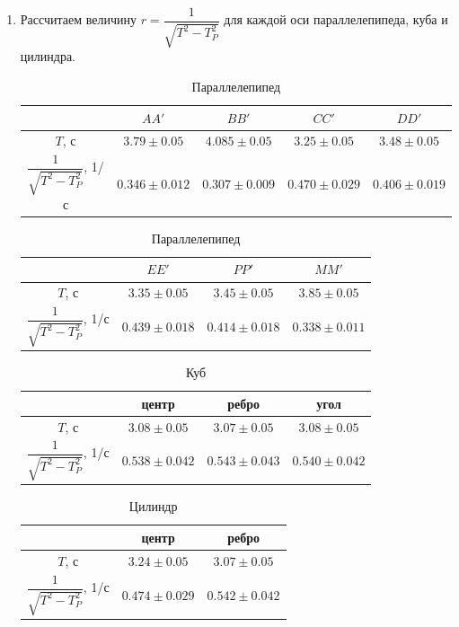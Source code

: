 \documentclass[a4paper,12pt]{article}
\begin{document}
\begin{enumerate}
    \item Рассчитаем величину $r = \dfrac{1}{\sqrt{T^2 - T^2_P}}$ для каждой оси параллелепипеда, куба и цилиндра.
        \begin{table}[!h]
            \centering
            \begin{tabular}{|c|c|c|c|c|} \hline
                 & $AA'$ & $BB'$ & $CC'$ & $DD'$ \\ \hline
                $T$, с & $3.79\pm0.05$ & $4.085\pm0.05$ & $3.25\pm0.05$ & $3.48\pm0.05$ \\ \hline
                $\dfrac{1}{\sqrt{T^2 - T^2_P}}$, 1/с & $0.346\pm0.012$ & $0.307\pm0.009$ & $0.470\pm0.029$ & $0.406\pm0.019$ \\ \hline
            	\end{tabular}
        	\caption{Параллелепипед}
    	\end{table}
    	\begin{table}[!h]
    		\centering
    		\begin{tabular}{|c|c|c|c|} \hline
    			 & $EE'$ & $PP'$ & $MM'$ \\ \hline
                $T$, с & $3.35\pm0.05$ & $3.45\pm0.05$ &  $3.85\pm0.05$ \\ \hline
                $\dfrac{1}{\sqrt{T^2 - T^2_P}}$, 1/с & $0.439\pm0.018$ & $0.414\pm0.018$ & $0.338\pm0.011$ \\ \hline
            \end{tabular}
            \caption{Параллелепипед}
        \end{table}
    	\begin{table}[!h]
    		\centering
    		\begin{tabular}{|c|c|c|c|} \hline
    			& центр & ребро & угол \\ \hline
    			$T$, с & $3.08\pm0.05$ & $3.07\pm0.05$ &  $3.08\pm0.05$ \\ \hline
    			$\dfrac{1}{\sqrt{T^2 - T^2_P}}$, 1/с & $0.538\pm0.042$ & $0.543\pm0.043$ & $0.540\pm0.042$ \\ \hline
    		\end{tabular}
    		\caption{Куб}
    	\end{table}
    	\begin{table}[!h]
    		\centering
    		\begin{tabular}{|c|c|c|} \hline
    			& центр & ребро \\ \hline
    			$T$, с & $3.24\pm0.05$ &  $3.07\pm0.05$ \\ \hline
    			$\dfrac{1}{\sqrt{T^2 - T^2_P}}$, 1/с & $0.474\pm0.029$ & $0.542\pm0.042$ \\ \hline
    		\end{tabular}
    		\caption{Цилиндр}
    	\end{table}
    

\end{enumerate}
\end{document}
